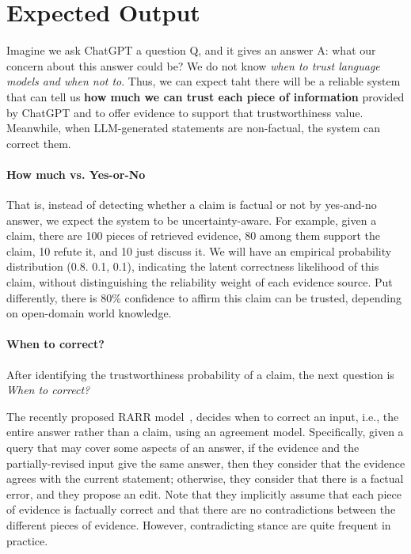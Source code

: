 \documentclass[11pt]{article}
\begin{document}
\section{Expected Output}
Imagine we ask ChatGPT a question Q, and it gives an answer A: what our concern about this answer could be?
We do not know \textit{when to trust language models and when not to}.
Thus, we can expect taht there will be a reliable system that can tell us \textbf{how much we can trust each piece of information} provided by ChatGPT and to offer evidence to support that trustworthiness value.
Meanwhile, when LLM-generated statements are non-factual, the system can correct them.

\paragraph{How much vs. Yes-or-No}
That is, instead of detecting whether a claim is factual or not by yes-and-no answer, we expect the system to be uncertainty-aware. 
For example, given a claim, there are 100 pieces of retrieved evidence, 80 among them support the claim, 10 refute it, and 10 just discuss it.
We will have an empirical probability distribution (0.8. 0.1, 0.1), indicating the latent correctness likelihood of this claim, without distinguishing the reliability weight of each evidence source. 
Put differently, there is 80\% confidence to affirm this claim can be trusted, depending on open-domain world knowledge.

\paragraph{When to correct?}
After identifying the trustworthiness probability of a claim, the next question is \emph{When to correct?}

The recently proposed RARR model~\citep{gao2022attributed}, decides when to correct an input, i.e., the entire answer rather than a claim, using an agreement model.
Specifically, given a query that may cover some aspects of an answer, if the evidence and the partially-revised input give the same answer, then they consider that the evidence agrees with the current statement; otherwise, they consider that there is a factual error, and they propose an edit.
Note that they implicitly assume that each piece of evidence is factually correct and that there are no contradictions between the different pieces of evidence. However, contradicting stance are quite frequent in practice.
\end{document}
